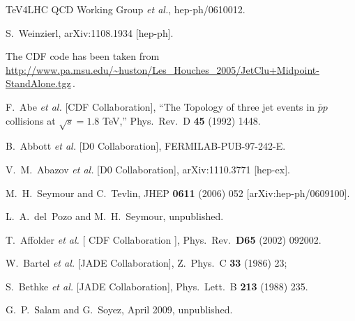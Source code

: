 \documentclass[12pt,a4]{article}
\begin{document}
\begin{thebibliography}{99}
  TeV4LHC QCD Working Group {\it et al.},
  hep-ph/0610012.

  S.~Weinzierl,
  arXiv:1108.1934 [hep-ph].


 The CDF code has been taken from \\
  \url{http://www.pa.msu.edu/~huston/Les_Houches_2005/JetClu+Midpoint-StandAlone.tgz}\,.

  F.~Abe {\it et al.}  [CDF Collaboration],
  ``The Topology of three jet events in $\bar{p}p$ collisions at $\sqrt{s} =
  1.8$ TeV,''
  Phys.\ Rev.\ D {\bf 45} (1992) 1448.

  B.~Abbott {\it et al.} [D0 Collaboration],
  FERMILAB-PUB-97-242-E.

  V.~M.~Abazov {\it et al.} [D0 Collaboration],
  arXiv:1110.3771 [hep-ex].

  M.~H.~Seymour and C.~Tevlin,
  JHEP {\bf 0611} (2006) 052
  [arXiv:hep-ph/0609100].

 L.~A.~del~Pozo and M.~H.~Seymour, unpublished.

  T.~Affolder {\it et al.} [ CDF Collaboration ],
  Phys.\ Rev.\  {\bf D65 } (2002)  092002.

  W.~Bartel {\it et al.}  [JADE Collaboration],
  Z.\ Phys.\ C {\bf 33} (1986) 23; 

  S.~Bethke {\it et al.}  [JADE Collaboration],
  Phys.\ Lett.\ B {\bf 213} (1988) 235.

 G.~P.~Salam and G.~Soyez, April 2009,
  unpublished. 


\end{thebibliography}
\end{document}
